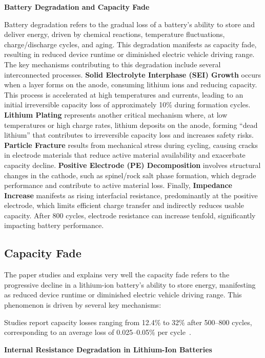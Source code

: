 \textbf{Battery Degradation and Capacity Fade}

Battery degradation refers to the gradual loss of a battery's ability to store and deliver energy, driven by chemical reactions, temperature fluctuations, charge/discharge cycles, and aging. This degradation manifests as capacity fade, resulting in reduced device runtime or diminished electric vehicle driving range. The key mechanisms contributing to this degradation include several interconnected processes. \textbf{Solid Electrolyte Interphase (SEI) Growth} occurs when a layer forms on the anode, consuming lithium ions and reducing capacity. This process is accelerated at high temperatures and currents, leading to an initial irreversible capacity loss of approximately 10\% during formation cycles. \textbf{Lithium Plating} represents another critical mechanism where, at low temperatures or high charge rates, lithium deposits on the anode, forming ``dead lithium'' that contributes to irreversible capacity loss and increases safety risks. \textbf{Particle Fracture} results from mechanical stress during cycling, causing cracks in electrode materials that reduce active material availability and exacerbate capacity decline. \textbf{Positive Electrode (PE) Decomposition} involves structural changes in the cathode, such as spinel/rock salt phase formation, which degrade performance and contribute to active material loss. Finally, \textbf{Impedance Increase} manifests as rising interfacial resistance, predominantly at the positive electrode, which limits efficient charge transfer and indirectly reduces usable capacity. After 800 cycles, electrode resistance can increase tenfold, significantly impacting battery performance.

\subsection{Capacity Fade}
The \cite{zhang_studies_2000} paper studies and explains very well the capacity fade refers to the progressive decline in a lithium-ion battery’s ability to store energy, manifesting as reduced device runtime or diminished electric vehicle driving range. This phenomenon is driven by several key mechanisms:



Studies report capacity losses ranging from 12.4\% to 32\% after 500--800 cycles, corresponding to an average loss of 0.025--0.05\% per cycle~\cite{zhang_studies_2000}.


\textbf{Internal Resistance Degradation in Lithium-Ion Batteries}

